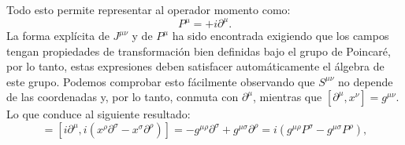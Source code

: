 \documentclass[a4paper,11pt]{book} %
\begin{document}
Todo esto permite representar al operador momento como:
\begin{equation}
P^{\mu}=+i\partial^{\mu}.
\end{equation} 
\noindent
La forma explícita de $J^{\mu\nu}$ y de $P^{\mu}$ ha sido encontrada exigiendo que los campos tengan propiedades de transformación bien definidas bajo el grupo de Poincaré, por lo tanto, estas expresiones deben satisfacer automáticamente el álgebra de este grupo. Podemos comprobar esto fácilmente observando que $S^{\mu\nu}$ no depende de las coordenadas y, por lo tanto, conmuta con $\partial^{\mu}$, mientras que $[\partial^{\mu},x^{\nu}]=g^{\mu\nu}$. Lo que conduce al siguiente resultado:
\begin{equation}
[P^{\mu},J^{\rho\sigma}]=[i\partial^{\mu},i(x^{\rho}\partial^{\sigma}-x^{\sigma}\partial^{\rho})]=-g^{\mu\rho}\partial^{\sigma}+g^{\mu\sigma}\partial^{\rho} =i(g^{\mu\rho}P^{\sigma}-g^{\mu\sigma}P^{\rho}),
\end{equation} %
\end{document}
